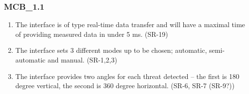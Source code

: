 \documentclass[Main]{subfiles}
\begin{document}
\subsubsection{MCB\_1.1}
\begin{enumerate}[{4.1.3.1}-1]
\setcounter{enumi}{0}

\item The interface is of type real-time data transfer and will have a maximal time of providing measured data in under 5 ms. (SR-19)

\item The interface sets 3 different modes up to be chosen; automatic, semi-automatic and manual. (SR-1,2,3)

\item The interface provides two angles for each threat detected -- the first is 180 degree vertical, the second is 360 degree horizontal. (SR-6, SR-7 (SR-9?))
\end{enumerate}
\end{document}
